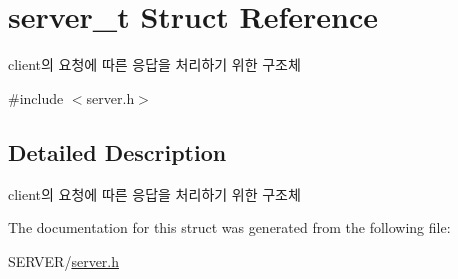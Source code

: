 \hypertarget{structserver__t}{\section{server\-\_\-t Struct Reference}
\label{structserver__t}
}


client의 요청에 따른 응답을 처리하기 위한 구조체  




{\ttfamily \#include $<$server.\-h$>$}



\subsection{Detailed Description}
client의 요청에 따른 응답을 처리하기 위한 구조체 

The documentation for this struct was generated from the following file\-:\begin{DoxyCompactItemize}
\item 
S\-E\-R\-V\-E\-R/\hyperlink{server_8h}{server.\-h}\end{DoxyCompactItemize}
